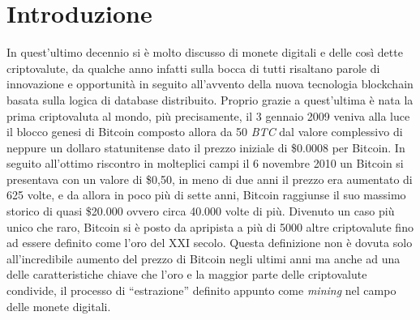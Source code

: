 \documentclass[
11pt, %
oneside, %
italian, %
onehalfspacing,%
headsepline, %
]{MastersDoctoralThesis} %
\begin{document}
{\chapter{Introduzione}}
In quest'ultimo decennio si è molto discusso di monete digitali e delle così dette criptovalute, da qualche anno infatti sulla bocca di tutti risaltano parole di innovazione e opportunità in seguito all'avvento della nuova tecnologia blockchain basata sulla logica di database distribuito. Proprio grazie a quest'ultima è nata la prima criptovaluta al mondo, più precisamente, il 3 gennaio 2009 veniva alla luce il blocco genesi di Bitcoin composto allora da 50 \emph{BTC} dal valore complessivo di neppure un dollaro statunitense dato il prezzo iniziale di \$0.0008 per Bitcoin. In seguito all'ottimo riscontro in molteplici campi il 6 novembre 2010 un Bitcoin si presentava con un valore di \$0,50, in meno di due anni il prezzo era aumentato di 625 volte, e da allora in poco più di sette anni, Bitcoin raggiunse il suo massimo storico di quasi \$20.000 ovvero circa 40.000 volte di più. Divenuto un caso più unico che raro, Bitcoin si è posto da apripista a più di 5000 altre criptovalute fino ad essere definito come l'oro del \RN{21} secolo. Questa definizione non è dovuta solo all'incredibile aumento del prezzo di Bitcoin negli ultimi anni ma anche ad una delle caratteristiche chiave che l'oro e la maggior parte delle criptovalute condivide, il processo di ``estrazione'' definito appunto come \emph{mining} nel campo delle monete digitali.\\
\end{document}

